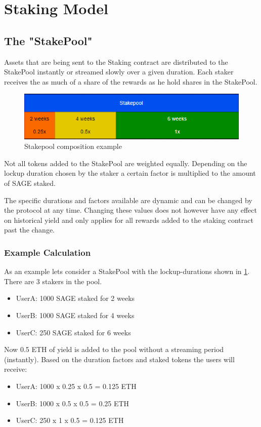 \documentclass{article}
\begin{document}
\section{Staking Model}

\subsection{The "StakePool"}
\label{sec:stakepool}
Assets that are being sent to the Staking contract are distributed to the StakePool instantly or streamed slowly over a given duration.
Each staker receives the as much of a share of the rewards as he hold shares in the StakePool.

\begin{figure}[h!]
\centering
\includegraphics[width=0.75\linewidth]{stakepool.png}
\caption{Stakepool composition example}
\label{fig:stakepool}
\end{figure}

Not all tokens added to the StakePool are weighted equally. Depending on the lockup duration chosen by the staker a certain factor is multiplied to the amount of SAGE staked.

The specific durations and factors available are dynamic and can be changed by the protocol at any time. Changing these values does not however have any effect on historical yield and only applies for all rewards added to the staking contract past the change.

\subsubsection{Example Calculation}
As an example lets consider a StakePool with the lockup-durations shown in \ref{fig:stakepool}.
There are 3 stakers in the pool.
\begin{itemize}
    \item UserA: 1000 SAGE staked for 2 weeks
    \item UserB: 1000 SAGE staked for 4 weeks
    \item UserC: 250 SAGE staked for 6 weeks
\end{itemize}

Now 0.5 ETH of yield is added to the pool without a streaming period (instantly). Based on the duration factors and staked tokens the users will receive:
\begin{itemize}
    \item UserA: 1000 x 0.25 x 0.5 = 0.125 ETH
    \item UserB: 1000 x 0.5 x 0.5 = 0.25 ETH
    \item UserC: 250 x 1 x 0.5 = 0.125 ETH
\end{itemize}
\end{document}
